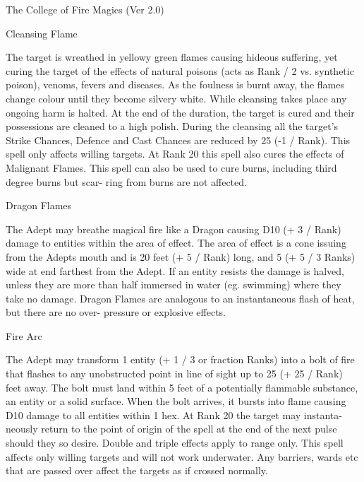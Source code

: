 \begin{Chapter}{The College of Fire Magics (Ver 2.0)}
\begin{spell}[S-1]{Cleansing Flame}
\begin{effects}
The target is wreathed in yellowy green flames causing hideous
suffering, yet curing the target of the effects of natural poisons
(acts as Rank / 2 vs. synthetic poison), venoms, fevers and
diseases. As the foulness is burnt away, the flames change colour
until they become silvery white.  While cleansing takes place any
ongoing harm is halted.  At the end of the duration, the target is
cured and their possessions are cleaned to a high polish.  During the
cleansing all the target’s Strike Chances, Defence and Cast Chances
are reduced by 25 (-1 / Rank).  This spell only affects willing
targets. At Rank 20 this spell also cures the effects of Malignant
Flames. This spell can also be used to cure burns, including third
degree burns but scar- ring from burns are not affected.
\end{effects}
\end{spell}

\begin{spell}[S-2]{Dragon Flames}

\begin{effects}
The Adept may breathe magical fire like a Dragon causing D10 (+ 3 /
Rank) damage to entities within the area of effect. The area of effect
is a cone issuing from the Adepts mouth and is 20 feet (+ 5 / Rank)
long, and 5 (+ 5 / 3 Ranks) wide at end farthest from the Adept. If an
entity resists the damage is halved, unless they are more than half
immersed in water (eg. swimming) where they take no damage.  Dragon
Flames are analogous to an instantaneous flash of heat, but there are
no over- pressure or explosive effects.
\end{effects}
\end{spell}

\begin{spell}[S-3]{Fire Arc}

\begin{effects}
The Adept may transform 1 entity (+ 1 / 3 or fraction Ranks) into a
bolt of fire that flashes to any unobstructed point in line of sight
up to 25 (+ 25 / Rank) feet away. The bolt must land within 5 feet of
a potentially flammable substance, an entity or a solid surface.  When
the bolt arrives, it bursts into flame causing D10 damage to all
entities within 1 hex.  At Rank 20 the target may instanta- neously
return to the point of origin of the spell at the end of the next
pulse should they so desire.  Double and triple effects apply to range
only. This spell affects only willing targets and will not work
underwater. Any barriers, wards etc that are passed over affect the
targets as if crossed normally.
\end{effects}
\end{spell}


\end{Chapter}
